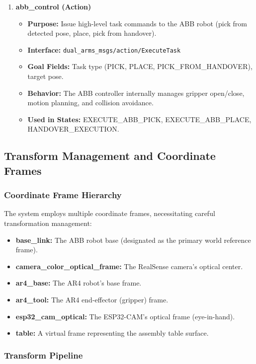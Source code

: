 \begin{enumerate}
    \item \textbf{abb\_control (Action)}
    \begin{itemize}
        \item \textbf{Purpose:} Issue high-level task commands to the ABB robot (pick from detected pose, place, pick from handover).
        \item \textbf{Interface:} \texttt{dual\_arms\_msgs/action/ExecuteTask}
        \item \textbf{Goal Fields:} Task type (PICK, PLACE, PICK\_FROM\_HANDOVER), target pose.
        \item \textbf{Behavior:} The ABB controller internally manages gripper open/close, motion planning, and collision avoidance.
        \item \textbf{Used in States:} EXECUTE\_ABB\_PICK, EXECUTE\_ABB\_PLACE, HANDOVER\_EXECUTION.
    \end{itemize}
\end{enumerate}

\subsection{Transform Management and Coordinate Frames}

\subsubsection{Coordinate Frame Hierarchy}

The system employs multiple coordinate frames, necessitating careful transformation management:

\begin{itemize}
    \item \textbf{base\_link:} The ABB robot base (designated as the primary world reference frame).
    \item \textbf{camera\_color\_optical\_frame:} The RealSense camera's optical center.
    \item \textbf{ar4\_base:} The AR4 robot's base frame.
    \item \textbf{ar4\_tool:} The AR4 end-effector (gripper) frame.
    \item \textbf{esp32\_cam\_optical:} The ESP32-CAM's optical frame (eye-in-hand).
    \item \textbf{table:} A virtual frame representing the assembly table surface.
\end{itemize}

\subsubsection{Transform Pipeline}


